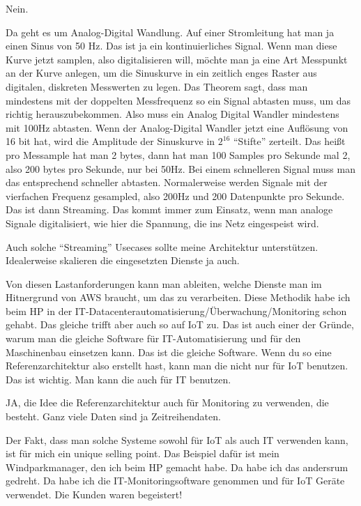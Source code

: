 \LF Nein.

\PE Da geht es um Analog-Digital Wandlung. Auf einer Stromleitung hat man ja einen Sinus von 50 Hz. Das ist ja ein kontinuierliches Signal. Wenn man diese Kurve jetzt samplen, also digitalisieren will, möchte man ja eine Art Messpunkt an der Kurve anlegen, um die Sinuskurve in ein zeitlich enges Raster aus digitalen, diskreten Messwerten zu legen. Das Theorem sagt, dass man mindestens  mit der doppelten Messfrequenz so ein Signal abtasten muss, um das richtig herauszubekommen. Also muss ein Analog Digital Wandler mindestens mit 100Hz abtasten. Wenn der Analog-Digital Wandler jetzt eine Auflösung von 16 bit hat, wird die Amplitude der Sinuskurve in $2^{16}$ \enquote{Stifte} zerteilt. Das heißt pro Messample hat man 2 bytes, dann hat man 100 Samples pro Sekunde mal 2, also 200 bytes pro Sekunde, nur bei 50Hz. Bei einem schnelleren Signal muss man das entsprechend schneller abtasten. Normalerweise werden Signale mit der vierfachen Frequenz gesampled, also 200Hz und 200 Datenpunkte pro Sekunde. Das ist dann Streaming. Das kommt immer zum Einsatz, wenn man analoge Signale digitalisiert, wie hier die Spannung, die  ins Netz eingespeist wird.

\LF Auch solche \enquote{Streaming} Usecases sollte meine Architektur unterstützen. Idealerweise skalieren die eingesetzten Dienste ja auch.

\PE Von diesen Lastanforderungen kann man ableiten, welche Dienste man im Hitnergrund von \ac{AWS} braucht, um das zu verarbeiten. Diese Methodik habe ich beim HP in der IT-Datacenterautomatisierung/Überwachung/Monitoring schon gehabt. Das gleiche trifft aber auch so auf \ac{IoT} zu. Das ist auch einer der Gründe, warum man die gleiche Software für IT-Automatisierung und für den Maschinenbau einsetzen kann. Das ist die gleiche Software. Wenn du so eine Referenzarchitektur also erstellt hast, kann man die nicht nur für \ac{IoT} benutzen. Das ist wichtig. Man kann die auch für IT benutzen.

\LF JA, die Idee die Referenzarchitektur auch für Monitoring zu verwenden, die besteht. Ganz viele Daten sind ja Zeitreihendaten.

\PE Der Fakt, dass man solche Systeme sowohl für \ac{IoT} als auch IT verwenden kann, ist für mich ein unique selling point. Das Beispiel dafür ist mein Windparkmanager, den ich beim HP gemacht habe. Da habe ich das andersrum gedreht. Da habe ich die IT-Monitoringsoftware genommen und für \ac{IoT} Geräte verwendet. Die Kunden waren begeistert! 

